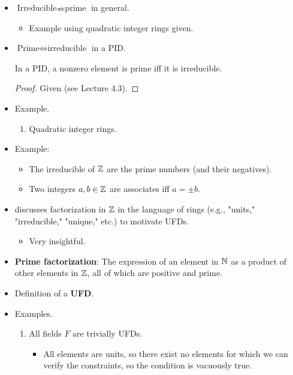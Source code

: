 \documentclass[../notes.tex]{subfiles}
\begin{document}
\begin{itemize}
\begin{proposition}
    \end{proposition}
    \item $\text{Irreducible}\nRightarrow\text{prime}$ in general.
    \begin{itemize}
        \item Example using quadratic integer rings given.
    \end{itemize}
    \item $\text{Prime}\Longleftrightarrow\text{irreducible}$ in a PID.
    \begin{proposition}\label{prp:8.11}
        In a PID, a nonzero element is prime iff it is irreducible.
        \begin{proof}
            Given (see Lecture 4.3).
        \end{proof}
    \end{proposition}
    \item Example.
    \begin{enumerate}
        \item Quadratic integer rings.
    \end{enumerate}
    \item Example:
    \begin{itemize}
        \item The irreducible of $\mathbb{Z}$ are the prime numbers (and their negatives).
        \item Two integers $a,b\in\mathbb{Z}$ are associates iff $a=\pm b$.
    \end{itemize}
    \item \textcite{bib:DummitFoote} discusses factorization in $\mathbb{Z}$ in the language of rings (e.g., "units," "irreducible," "unique," etc.) to motivate UFDs.
    \begin{itemize}
        \item Very insightful.
    \end{itemize}
    \item \textbf{Prime factorization}: The expression of an element in $\mathbb{N}$ as a product of other elements in $\mathbb{Z}$, all of which are positive and prime.
    \item Definition of a \textbf{UFD}.
    \item Examples.
    \begin{enumerate}
        \item All fields $F$ are trivially UFDs.
        \begin{itemize}
            \item All elements are units, so there exist no elements for which we can verify the constraints, so the condition is vacuously true.

\end{itemize}
\end{enumerate}
\end{itemize}
\end{document}
